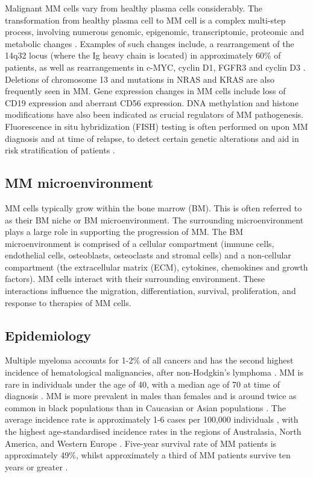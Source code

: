 Malignant MM cells vary from healthy plasma cells considerably.
The transformation from healthy plasma cell to MM cell is a complex multi-step process, involving numerous genomic, epigenomic, transcriptomic, proteomic and metabolic changes \cite{de2002comparison, caprio2020epigenetic, chanukuppa2021proteomic, el2018metabolic}.
Examples of such changes include, a rearrangement of the 14q32 locus (where the Ig heavy chain is located) \cite{nishida1997ig} in approximately 60\% of patients, as well as rearrangements in c-MYC, cyclin D1, FGFR3 and cyclin D3 \cite{de2002comparison}.
Deletions of chromosome 13 and mutations in NRAS and KRAS are also frequently seen in MM\@.
Gene expression changes in MM cells include loss of CD19 expression and aberrant CD56 expression.
DNA methylation and histone modifications have also been indicated as crucial regulators of MM pathogenesis.
Fluorescence in situ hybridization (FISH) testing is often performed on upon MM diagnosis and at time of relapse, to detect certain genetic alterations and aid in risk stratification of patients \cite{swerdlow2008classification}.

\subsection{MM microenvironment}
MM cells typically grow within the bone marrow (BM).
This is often referred to as their BM niche or BM microenvironment.
The surrounding microenvironment plays a large role in supporting the progression of MM.
The BM microenvironment is comprised of a cellular compartment (immune cells, endothelial cells, osteoblasts, osteoclasts and stromal cells) and a non-cellular compartment (the extracellular matrix (ECM), cytokines, chemokines and growth factors)\cite{manier2012bone, kawano2015targeting}.
MM cells interact with their surrounding environment.
These interactions influence the migration, differentiation, survival, proliferation, and response to therapies of MM cells.

\subsection{Epidemiology}
Multiple myeloma accounts for 1-2\% of all cancers and has the second highest incidence of hematological malignancies, after non-Hodgkin's lymphoma \cite{international2003criteria}.
MM is rare in individuals under the age of 40, with a median age of 70 at time of diagnosis \cite{tsang2019multiple, palumbo2011multiple}.
MM is more prevalent in males than females and is around twice as common in black populations than in Caucasian or Asian populations \cite{nhsmyeloma}.
The average incidence rate is approximately 1-6 cases per 100,000 individuals \cite{tsang2019multiple, palumbo2011multiple, teras20162016}, with the highest age-standardised incidence rates in the regions of Australasia, North America, and Western Europe \cite{cowan2018global}.
Five-year survival rate of MM patients is approximately 49\%, whilst approximately a third of MM patients survive ten years or greater \cite{cancerresearchuk, siegel2016cancer}.

